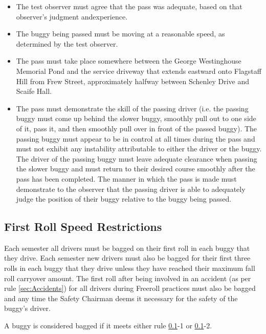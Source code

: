 	\begin{itemize}

		\item The test observer must agree that the pass was adequate, based on that observer's judgment andexperience.

		\item The buggy being passed must be moving at a reasonable speed, as determined by the test observer.

		\item The pass must take place somewhere between the George Westinghouse Memorial Pond and the service driveway that extends eastward onto Flagstaff Hill from Frew Street, approximately halfway between Schenley Drive and Scaife Hall.

		\item The pass must demonstrate the skill of the passing driver (i.e. the passing buggy must come up behind the slower buggy, smoothly pull out to one side of it, pass it, and then smoothly pull over in front of the passed buggy). The passing buggy must appear to be in control at all times during the pass and must not exhibit any instability attributable to either the driver or the buggy. The driver of the passing buggy must leave adequate clearance when passing the slower buggy and must return to their desired course smoothly after the pass has been completed. The manner in which the pass is made must demonstrate to the observer that the passing driver is able to adequately judge the position of their buggy relative to the buggy being passed.

	\end{itemize}

\subsection{First Roll Speed Restrictions}
\label{sec:FirstRollSpeedRestrictions}

	Each semester all drivers must be bagged on their first roll in each buggy that they drive. Each semester new drivers must also be bagged for their first three rolls in each buggy that they drive unless they have reached their maximum fall roll carryover amount. The first roll after being involved in an accident (as per rule \ref{sec:Accidents}) for all drivers during Freeroll practices must also be bagged and any time the Safety Chairman deems it necessary for the safety of the buggy's driver.

	A buggy is considered bagged if it meets either rule
	\ref{sec:FirstRollSpeedRestrictions}-1 or \ref{sec:FirstRollSpeedRestrictions}-2.

